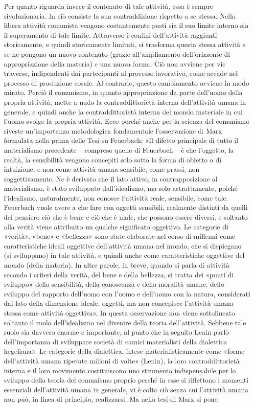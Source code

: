 \documentclass[12pt,a4paper,openany]{book}
\begin{document}
Per quanto riguarda invece il contenuto di tale attività, essa è sempre rivoluzionaria. In ciò consiste la sua contraddizione rispetto a se stessa. Nella libera attività comunista vengono costantemente posti sia il suo limite interno sia il superamento di tale limite. Attraverso i confini dell'attività raggiunti storicamente, e quindi storicamente limitati, si trasforma questa stessa attività e se ne pongono un nuovo contenuto (grazie all'ampliamento dell'orizzonte di appropriazione della materia) e una nuova forma. Ciò non avviene per vie traverse, indipendenti dai partecipanti al processo lavorativo, come accade nel processo di produzione cosale. Al contrario, questo cambiamento avviene in modo mirato. Perciò il comunismo, in quanto appropriazione da parte dell'uomo della propria attività, mette a nudo la contraddittorietà interna dell'attività umana in generale, e quindi anche la contraddittorietà interna del mondo materiale in cui l'uomo svolge la propria attività. Ecco perché anche per la scienza del comunismo riveste un'importanza metodologica fondamentale l'osservazione di Marx formulata nella prima delle Tesi su Feuerbach: «Il difetto principale di tutto il materialismo precedente – compreso quello di Feuerbach – è che l'oggetto, la realtà, la sensibilità vengono concepiti solo sotto la forma di obietto o di intuizione, e non come attività umana sensibile, come prassi, non soggettivamente. Ne è derivato che il lato attivo, in contrapposizione al materialismo, è stato sviluppato dall'idealismo, ma solo astrattamente, poiché l'idealismo, naturalmente, non conosce l'attività reale, sensibile, come tale. Feuerbach vuole avere a che fare con oggetti sensibili, realmente distinti da quelli del pensiero ciò che è bene e ciò che è male, che possono essere diversi, e soltanto alla verità viene attribuito un qualche significato oggettivo. Le categorie di «verità», «bene» e «bellezza» sono state elaborate nel corso di millenni come caratteristiche ideali oggettive dell'attività umana nel mondo, che si dispiegano (si sviluppano) in tale attività, e quindi anche come caratteristiche oggettive del mondo (della materia). In altre parole, in breve, quando si parla di attività secondo i criteri della verità, del bene e della bellezza, si tratta dei «punti di sviluppo» della sensibilità, della conoscenza e della moralità umane, dello sviluppo del rapporto dell'uomo con l'uomo e dell'uomo con la natura, considerati dal lato della dimensione ideale. oggetti, ma non concepisce l'attività umana stessa come attività oggettiva». In questa osservazione non viene sottolineato soltanto il ruolo dell'idealismo nel divenire della teoria dell'attività. Sebbene tale ruolo sia davvero enorme e importante, al punto che in seguito Lenin parlò dell'importanza di sviluppare società di «amici materialisti della dialettica hegeliana». Le categorie della dialettica, intese materialisticamente come «forme dell'attività umana ripetute milioni di volte» (Lenin), la loro contraddittorietà interna e il loro movimento costituiscono uno strumento indispensabile per lo sviluppo della teoria del comunismo proprio perché in esse si riflettono i momenti essenziali dell'attività umana in generale, vi è colto ciò senza cui l'attività umana non può, in linea di principio, realizzarsi. Ma nella tesi di Marx si pone 
\end{document}
